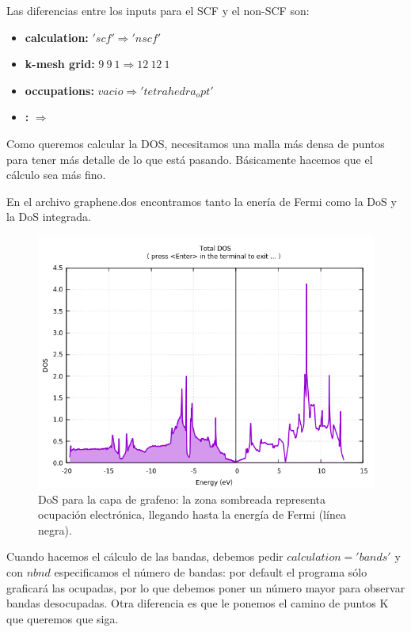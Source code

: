   Las diferencias entre los inputs para el SCF y el non-SCF son:
    \begin{itemize}
      \item \textbf{calculation:} $'scf' \Rightarrow'nscf'$
      \item \textbf{k-mesh grid:} $9\ 9\ 1 \Rightarrow 12\ 12\ 1$
      \item \textbf{occupations:} $vacio \Rightarrow 'tetrahedra_opt'$
      \item \textbf{:} $ \Rightarrow $
    \end{itemize}

  Como queremos calcular la DOS, necesitamos una malla más densa de puntos para tener más detalle de lo que está pasando. Básicamente hacemos que el cálculo sea más fino.

  En el archivo graphene.dos encontramos tanto la enería de Fermi como la DoS y la DoS integrada.

  \begin{figure}[H]
      \centering
      \includegraphics[scale = 0.6]{figs/D1/dos.png}
      \caption{DoS para la capa de grafeno: la zona sombreada representa ocupación electrónica, llegando hasta la energía de Fermi (línea negra).}
  \end{figure}

  Cuando hacemos el cálculo de las bandas, debemos pedir $calculation = 'bands'$ y con $nbnd$ especificamos el número de bandas: por default el programa sólo graficará las ocupadas, por lo que debemos poner un número mayor para observar bandas desocupadas. Otra diferencia es que le ponemos el camino de puntos K que queremos que siga.

